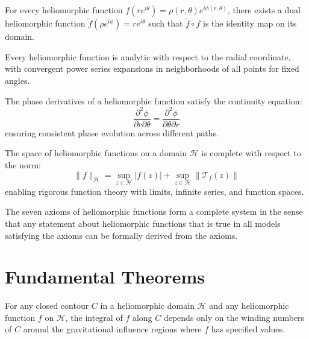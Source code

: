 \begin{axiom}
For every heliomorphic function $f(re^{i\theta}) = \rho(r,\theta)e^{i\phi(r,\theta)}$, there exists a dual heliomorphic function $\tilde{f}(\rho e^{i\phi}) = re^{i\theta}$ such that $\tilde{f} \circ f$ is the identity map on its domain.
\end{axiom}

\begin{axiom}
Every heliomorphic function is analytic with respect to the radial coordinate, with convergent power series expansions in neighborhoods of all points for fixed angles.
\end{axiom}

\begin{axiom}
The phase derivatives of a heliomorphic function satisfy the continuity equation:
\begin{equation}
\frac{\partial^2 \phi}{\partial r \partial \theta} = \frac{\partial^2 \phi}{\partial \theta \partial r}
\end{equation}
ensuring consistent phase evolution across different paths.
\end{axiom}

\begin{axiom}[Completeness]
The space of heliomorphic functions on a domain $\mathcal{H}$ is complete with respect to the norm:
\begin{equation}
\|f\|_{\mathcal{H}} = \sup_{z \in \mathcal{H}} |f(z)| + \sup_{z \in \mathcal{H}} \|\mathcal{T}_f(z)\|
\end{equation}
enabling rigorous function theory with limits, infinite series, and function spaces.
\end{axiom}

\begin{theorem}
The seven axioms of heliomorphic functions form a complete system in the sense that any statement about heliomorphic functions that is true in all models satisfying the axioms can be formally derived from the axioms.
\end{theorem}

\section{Fundamental Theorems}

\begin{theorem}
For any closed contour $C$ in a heliomorphic domain $\mathcal{H}$ and any heliomorphic function $f$ on $\mathcal{H}$, the integral of $f$ along $C$ depends only on the winding numbers of $C$ around the gravitational influence regions where $f$ has specified values.
\end{theorem}

